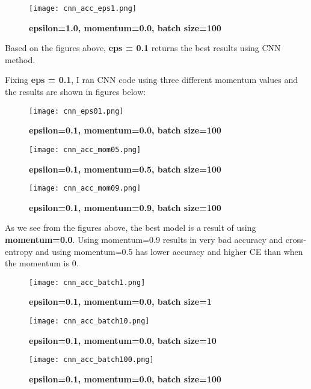\documentclass[10pt]{article}
\begin{document}
\begin{figure}[H]
	\centering
	\texttt{[image: cnn\_acc\_eps1.png]}
	\caption{\textbf{epsilon=1.0, momentum=0.0, batch size=100}}
	\label{fig:}
\end{figure}

Based on the figures above, \textbf{eps = 0.1} returns the best results using CNN method.

Fixing \textbf{eps = 0.1}, I ran CNN code using three different momentum values and the results are shown in figures below:

\begin{figure}[H]
	\centering
	\texttt{[image: cnn\_eps01.png]}
	\caption{\textbf{epsilon=0.1, momentum=0.0, batch size=100}}
	\label{fig:}
\end{figure}


\begin{figure}[H]
	\centering
	\texttt{[image: cnn\_acc\_mom05.png]}
	\caption{\textbf{epsilon=0.1, momentum=0.5, batch size=100}}
	\label{fig:}
\end{figure}


\begin{figure}[H]
	\centering
	\texttt{[image: cnn\_acc\_mom09.png]}
	\caption{\textbf{epsilon=0.1, momentum=0.9, batch size=100}}
	\label{fig:}
\end{figure}

As we see from the figures above, the best model is a result of using \textbf{momentum=0.0}. Using momentum=0.9 results in very bad accuracy and cross-entropy and using momentum=0.5 has lower accuracy and higher CE than when the momentum is 0.

\begin{figure}[H]
	\centering
	\texttt{[image: cnn\_acc\_batch1.png]}
	\caption{\textbf{epsilon=0.1, momentum=0.0, batch size=1}}
	\label{fig:}
\end{figure}


\begin{figure}[H]
	\centering
	\texttt{[image: cnn\_acc\_batch10.png]}
	\caption{\textbf{epsilon=0.1, momentum=0.0, batch size=10}}
	\label{fig:}
\end{figure}

\begin{figure}[H]
	\centering
	\texttt{[image: cnn\_acc\_batch100.png]}
	\caption{\textbf{epsilon=0.1, momentum=0.0, batch size=100}}
	\label{fig:}
\end{figure}
\end{document}
